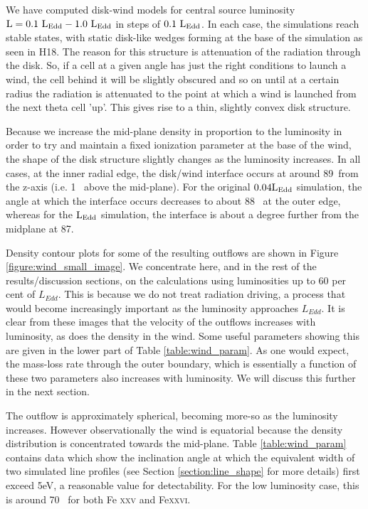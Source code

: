 \documentclass[a4paper,fleqn,usenatbib]{mnras}
\begin{document}
We have computed disk-wind models for central source luminosity 
$\rm{L=0.1~L_{Edd}-1.0~L_{Edd}}$ in steps of $\rm{0.1~L_{Edd}}$. In each case, the simulations reach stable states, 
with static disk-like wedges forming at the base of the simulation as seen in H18. The reason for this
structure is attenuation of the radiation through the disk. So, if a cell at a given angle has just the right
conditions to launch a wind, the cell behind it will be slightly obscured and so on until at a certain radius
the radiation is attenuated to the point at which a wind is launched from the next theta cell 'up'. This gives
rise to a thin, slightly convex disk structure. 

Because we increase the mid-plane density in proportion to the luminosity in order to try and maintain 
a fixed ionization parameter at the base of the wind, the shape of the disk structure slightly changes as
the luminosity increases. In all cases, at the inner radial edge, the disk/wind interface occurs at 
around 89\degree~from the z-axis (i.e. 1\degree~ above the mid-plane). For the original $\rm{0.04L_{Edd}}$ 
simulation, the angle at which the interface occurs decreases to about 88\degree~ at the outer edge, whereas for 
the $\rm{L_{Edd}}$ simulation, the interface is about a degree further from the
midplane at 87\degree.

Density contour plots for some of the resulting outflows are shown in Figure \ref{figure:wind_small_image}.
We concentrate here, and in the rest of the results/discussion sections, on the calculations using luminosities
up to 60 per cent of $L_{Edd}$. This is because we do not treat radiation driving, a process
that would become increasingly important as the luminosity approaches $L_{Edd}$.
It is clear from these images that the velocity of the outflows increases with luminosity, as does the 
density in the wind. Some useful parameters showing this are given in the lower part of Table \ref{table:wind_param}.
As one would expect, the mass-loss rate through the outer boundary, which is essentially a function of these 
two parameters also increases with luminosity. We will discuss this further in the next section. 

The outflow is approximately spherical, becoming more-so as the luminosity increases. However observationally
the wind is equatorial because the density distribution is concentrated towards the mid-plane. 
Table \ref{table:wind_param} contains data which show the inclination angle at which the 
equivalent width of two simulated line profiles (see Section \ref{section:line_shape} for more details) first exceed
5eV, a reasonable value for detectability. For the low luminosity case, this is around 70\degree~ for both
Fe \textsc{xxv} and Fe\textsc{xxvi}.
\end{document}
